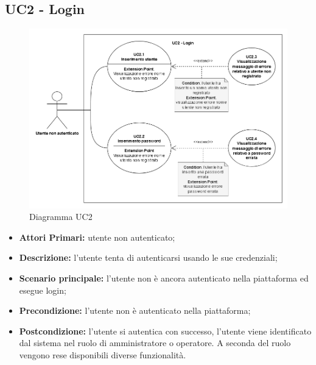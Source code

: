 \subsection{UC2 - Login}

\begin{figure}[h!]
	\includegraphics[width=17cm]{images/UC2.png}
	\caption{Diagramma UC2}
\end{figure}

\begin{itemize}
	\item \textbf{Attori Primari:} utente non autenticato;
	\item \textbf{Descrizione:} l'utente tenta di autenticarsi usando le sue credenziali;
	\item \textbf{Scenario principale:} l'utente non è ancora autenticato nella piattaforma ed esegue login;
	\item \textbf{Precondizione:} l'utente non è autenticato nella piattaforma;
	\item \textbf{Postcondizione:} l'utente si autentica con successo, l'utente viene identificato dal sistema nel ruolo di amministratore o operatore. A seconda del ruolo vengono rese disponibili diverse funzionalità.
\end{itemize}

